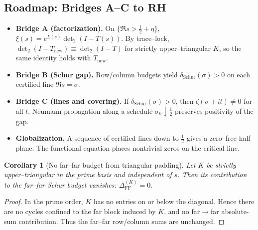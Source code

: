 \documentclass[11pt]{article}
\newtheorem{corollary}[theorem]{Corollary}
\theoremstyle{definition}
\theoremstyle{remark}
\begin{document}
\subsection*{Roadmap: Bridges A--C to RH}
\begin{itemize}
\item \textbf{Bridge A (factorization).} On $\{\Re s>\tfrac12+\eta\}$, $\xi(s)=e^{L(s)}\det_2(I-T(s))$. By trace--lock, $\det_2(I-T_{\mathrm{new}})\equiv\det_2(I-T)$ for strictly upper--triangular $K$, so the same identity holds with $T_{\mathrm{new}}$.
\item \textbf{Bridge B (Schur gap).} Row/column budgets yield $\delta_{\mathrm{Schur}}(\sigma)>0$ on each certified line $\Re s=\sigma$.
\item \textbf{Bridge C (lines and covering).} If $\delta_{\mathrm{Schur}}(\sigma)>0$, then $\zeta(\sigma+it)\ne0$ for all $t$. Neumann propagation along a schedule $\sigma_k\downarrow\tfrac12$ preserves positivity of the gap.
\item \textbf{Globalization.} A sequence of certified lines down to $\tfrac12$ gives a zero--free half--plane. The functional equation places nontrivial zeros on the critical line.
\end{itemize}
\begin{corollary}[No far--far budget from triangular padding]\label{cor:K-no-FF}
Let $K$ be strictly upper--triangular in the prime basis and independent of $s$. Then its contribution to the far--far Schur budget vanishes: $\Delta_{\mathrm{FF}}^{(K)}=0$.
\end{corollary}
\begin{proof}
In the prime order, $K$ has no entries on or below the diagonal. Hence there are no cycles confined to the far block induced by $K$, and no far$\to$far absolute-sum contribution. Thus the far--far row/column sums are unchanged.
\end{proof}
\end{document}
